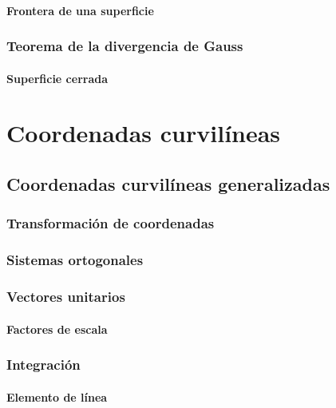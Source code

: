 \documentclass[12pt, fleqn]{report}                             %
\theoremstyle{break}                                            %
\begin{document}
            \subsection{Frontera de una superficie}
        
        \section{Teorema de la divergencia de Gauss}
        
            \subsection{Superficie cerrada}


\part{Coordenadas curvilíneas}

    \chapter{Coordenadas curvilíneas generalizadas}
    
        \section{Transformación de coordenadas}
        
        \section{Sistemas ortogonales}
        
        \section{Vectores unitarios}
        
            \subsection{Factores de escala}
        
        \section{Integración}
        
            \subsection{Elemento de línea}
            
\end{document}
